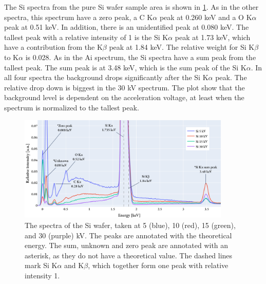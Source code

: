 The Si spectra from the pure Si wafer sample area is shown in \cref{fig:results:Spectra_Si}.
As in the other spectra, this spectrum have a zero peak, a C K$\alpha$ peak at 0.260 keV and a O K$\alpha$ peak at 0.51 keV.
In addition, there is an unidentified peak at 0.080 keV.
The tallest peak with a relative intensity of 1 is the Si K$\alpha$ peak at 1.73 keV, which have a contribution from the K$\beta$ peak at 1.84 keV.
The relative weight for Si K$\beta$ to K$\alpha$ is 0.028.
As in the Ai spectrum, the Si spectra have a sum peak from the tallest peak.
The sum peak is at 3.48 keV, which is the sum peak of the Si K$\alpha$.
In all four spectra the background drops significantly after the Si K$\alpha$ peak.
The relative drop down is biggest in the 30 kV spectrum.
The plot show that the background level is dependent on the acceleration voltage, at least when the spectrum is normalized to the tallest peak.


\begin{figure}[h!]
    \centering
    \includegraphics[width=0.90\textwidth]{figures/each_spectra/Si_everything.png}
    \caption{
        The spectra of the Si wafer, taken at 5 (blue), 10 (red), 15 (green), and 30 (purple) kV.
        The peaks are annotated with the theoretical energy.
        The sum, unknown and zero peak are annotated with an asterisk, as they do not have a theoretical value.
        The dashed lines mark Si K$\alpha$ and K$\beta$, which together form one peak with relative intensity 1.
    }
    \label{fig:results:Spectra_Si}
\end{figure}



